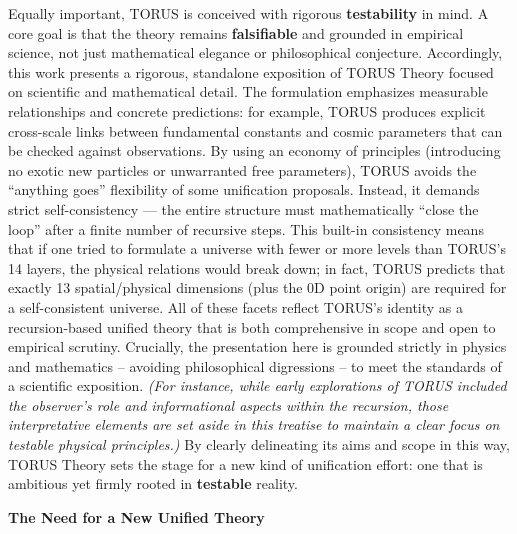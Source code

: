 \documentclass[
]{article}
\begin{document}
Equally important, TORUS is conceived with rigorous \textbf{testability}
in mind. A core goal is that the theory remains \textbf{falsifiable} and
grounded in empirical science, not just mathematical elegance or
philosophical conjecture. Accordingly, this work presents a rigorous,
standalone exposition of TORUS Theory focused on scientific and
mathematical detail. The formulation emphasizes measurable relationships
and concrete predictions: for example, TORUS produces explicit
cross-scale links between fundamental constants and cosmic parameters
that can be checked against observations. By using an economy of
principles (introducing no exotic new particles or unwarranted free
parameters), TORUS avoids the ``anything goes'' flexibility of some
unification proposals. Instead, it demands strict self-consistency ---
the entire structure must mathematically ``close the loop'' after a
finite number of recursive steps. This built-in consistency means that
if one tried to formulate a universe with fewer or more levels than
TORUS's 14 layers, the physical relations would break down; in fact,
TORUS predicts that exactly 13 spatial/physical dimensions (plus the 0D
point origin) are required for a self-consistent universe. All of these
facets reflect TORUS's identity as a recursion-based unified theory that
is both comprehensive in scope and open to empirical scrutiny.
Crucially, the presentation here is grounded strictly in physics and
mathematics -- avoiding philosophical digressions -- to meet the
standards of a scientific exposition. \emph{(For instance, while early
explorations of TORUS included the observer's role and informational
aspects within the recursion, those interpretative elements are set
aside in this treatise to maintain a clear focus on testable physical
principles.)} By clearly delineating its aims and scope in this way,
TORUS Theory sets the stage for a new kind of unification effort: one
that is ambitious yet firmly rooted in \textbf{testable} reality.

\textbf{The Need for a New Unified Theory}
\end{document}
